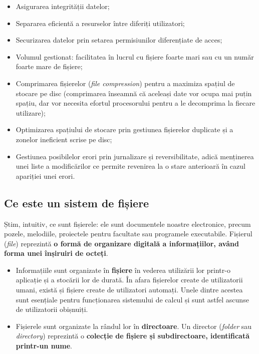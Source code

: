 \begin{itemize}
	\item Asigurarea integrității datelor;
	\item Separarea eficientă a resurselor între diferiți utilizatori;
	\item Securizarea datelor prin setarea permisiunilor diferențiate de acces;
	\item Volumul gestionat: facilitatea în lucrul cu fișiere foarte mari
		sau cu un număr foarte mare de fișiere;
	\item Comprimarea fișierelor (\textit{file compression}) pentru a
		maximiza spațiul de stocare pe disc (comprimarea înseamnă că
		aceleași date vor ocupa mai puțin spațiu, dar vor necesita
		efortul procesorului pentru a le decomprima la fiecare
		utilizare);
	\item Optimizarea spațiului de stocare prin gestiunea fișierelor
		duplicate și a zonelor ineficient scrise pe disc;
	\item Gestiunea posibilelor erori prin jurnalizare și reversibilitate,
		adică menținerea unei liste a modificărilor ce permite revenirea
		la o stare anterioară în cazul apariției unei erori.
\end{itemize}

\subsection{Ce este un sistem de fișiere}

Știm, intuitiv, ce sunt fișierele: ele sunt documentele noastre electronice,
precum pozele, melodiile, proiectele pentru facultate sau programele
executabile. Fișierul (\textit{file}) reprezintă \textbf{o formă de organizare
digitală a informațiilor, având forma unei înșiruiri de octeți}.

\begin{itemize}
	\item Informațiile sunt organizate în \textbf{fișiere} în vederea
		utilizării lor printr-o aplicație și a stocării lor de durată.
		În afara fișierelor create de utilizatorii umani, există și
		fișiere create de utilizatori automați. Unele dintre acestea
		sunt esențiale pentru funcționarea sistemului de calcul și sunt
		astfel ascunse de
		utilizatorii obișnuiți.
	\item Fișierele sunt organizate la rândul lor în \textbf{directoare}. Un
		director (\textit{folder} sau \textit{directory}) reprezintă o
		\textbf{colecție de fișiere și subdirectoare, identificată
		printr-un nume}.
\end{itemize}

